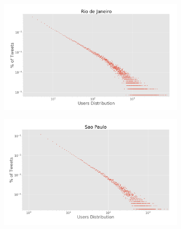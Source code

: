 \begin{figure}[h]
	\centering
	\begin{subfigure}[t]{0.45\textwidth}
		\centering
		\includegraphics[width=1\linewidth]{figures/rio_loglog_users.png}
		\caption{}
		\label{subfig:riodejaneiro_loglog_users}
	\end{subfigure}%
	\quad
	\begin{subfigure}[t]{0.45\textwidth}
		\centering
		\includegraphics[width=1\linewidth]{figures/sp_loglog_users.png}
		\caption{}
		\label{subfig:saopaulo_loglog_users}
	\end{subfigure}
	
	\medskip
	

\end{figure}
